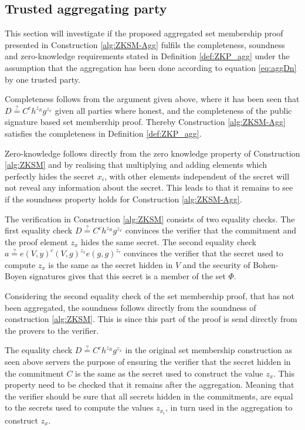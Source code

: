 \subsection*{Trusted aggregating party}
This section will investigate if the proposed aggregated set membership proof presented in Construction \ref{alg:ZKSM-Agg}  fulfils the completeness, soundness and zero-knowledge requirements stated in Definition \ref{def:ZKP_agg} under the  assumption that the aggregation has been done according to equation \eqref{eq:aggDn} by one trusted party. 

Completeness follows from the argument given above, where it has been seen that $D\overset{?}{=}C^ch^{z_R}g^{z_x}$ given all parties where honest, and the completeness of the public signature based set membership proof. Thereby Construction \ref{alg:ZKSM-Agg} satisfies the completeness in Definition \ref{def:ZKP_agg}. 

Zero-knowledge follows directly from the zero knowledge property of Construction \ref{alg:ZKSM} and by realising that multiplying and adding elements which perfectly hides the secret $x_i$, with other elements independent of the secret will not reveal any information about the secret. This leads to that it remains to see if the soundness property holds for Construction \ref{alg:ZKSM-Agg}. 

The verification in Construction \ref{alg:ZKSM} consists of two equality checks. The first equality check $D\overset{?}{=}C^ch^{z_R}g^{z_x}$ convinces the verifier that the commitment and the proof element $z_x$ hides the same secret. The second equality check $a\overset{?}{=} e(V,y)^c(V,g)^{z_x}e(g,g)^{z_\tau}$ convinces the verifier that the secret used to compute $z_x$ is the same as the secret hidden in $V$ and the security of Bohen-Boyen signatures gives that this secret is a member of the set $\Phi$.  

Considering the second equality check of the set membership proof, that has not been aggregated, the soundness follows directly from the soundness of construction \ref{alg:ZKSM}. This is since this part of the proof is send directly from the provers to the verifier. 

The equality check $D\overset{?}{=}C^ch^{z_R}g^{z_x}$ in the original set membership construction as seen above servers the purpose of ensuring the verifier that the secret hidden in the commitment $C$ is the same as the secret used to construct the value $z_x$. 
This property need to be checked that it remains after the aggregation. Meaning that the verifier should be sure that all secrets hidden in the commitments, are equal to the secrets used to compute the values $z_{x_i}$, in turn used in the aggregation to construct $z_x$. 


